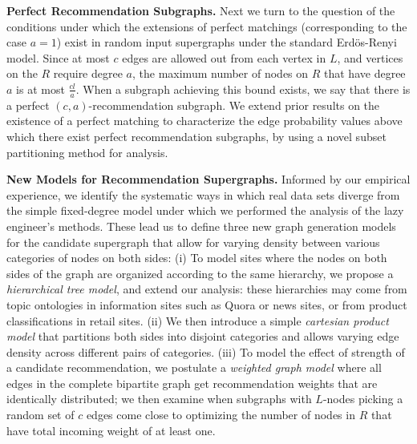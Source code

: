 \noindent
{\bf Perfect Recommendation Subgraphs.} Next we turn to the question
of the conditions under which the extensions of perfect matchings
(corresponding to the case $a=1$) exist in random input
supergraphs under the standard Erd\"os-Renyi model. Since at most $c$
edges are allowed out from each vertex in $L$, and vertices on the
$R$ require degree $a$, the maximum number of nodes on $R$
that have degree $a$ is at most $\frac{cl}{a}$. When a subgraph
achieving this bound exists, we say that there is a perfect
$(c,a)$-recommendation subgraph. We extend prior results on the
existence of a perfect matching to characterize the edge
probability values above which there exist perfect recommendation
subgraphs, by using a novel subset partitioning method for 
analysis. \vs
 

\noindent
{\bf New Models for Recommendation Supergraphs.}
Informed by our empirical experience, we identify the systematic ways in which real data sets diverge from the simple fixed-degree model under which we performed the analysis of the lazy engineer's methods. These lead us to define three new graph generation models for the candidate supergraph that allow for varying density between various categories of nodes on both sides: (i) To model sites where the nodes on both sides of the graph are organized according to the same hierarchy,
we propose a {\em hierarchical tree model}, and extend our analysis: these hierarchies may come from topic ontologies in information sites such as Quora or news sites, or from product classifications in retail sites.
(ii) We then introduce a simple {\em cartesian product model} that partitions both sides into disjoint categories
and allows varying edge density across different pairs of
categories. (iii) To model the effect of strength of a candidate recommendation, we postulate a {\em weighted graph model} where all edges in the complete bipartite graph get recommendation weights that are identically distributed; we then examine when subgraphs with $L$-nodes picking a random set of $c$ edges come close to optimizing the number of nodes in $R$ that have total incoming weight of at least one. \vs

